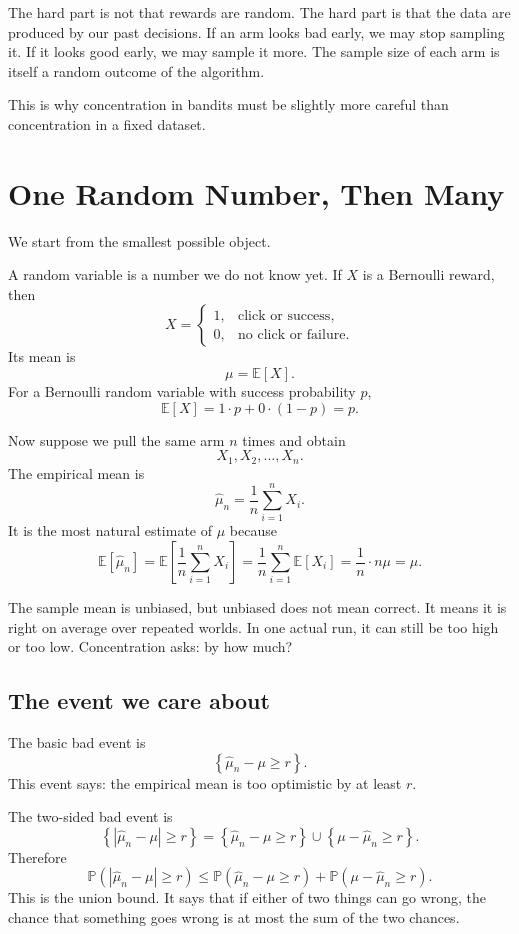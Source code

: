 \documentclass[en,nofont,11pt]{elegantbook}
\newcommand{\E}{\mathbb{E}}
\newcommand{\Pbb}{\mathbb{P}}
\begin{document}
The hard part is not that rewards are random. The hard part is that the data are produced by our past decisions. If an arm looks bad early, we may stop sampling it. If it looks good early, we may sample it more. The sample size of each arm is itself a random outcome of the algorithm.

This is why concentration in bandits must be slightly more careful than concentration in a fixed dataset.

\chapter{One Random Number, Then Many}

We start from the smallest possible object.

A random variable is a number we do not know yet. If $X$ is a Bernoulli reward, then
\[
X =
\begin{cases}
1, & \text{click or success},\\
0, & \text{no click or failure}.
\end{cases}
\]
Its mean is
\[
\mu = \E[X].
\]
For a Bernoulli random variable with success probability $p$,
\[
\E[X]
= 1\cdot p + 0\cdot (1-p)
= p.
\]

Now suppose we pull the same arm $n$ times and obtain
\[
X_1,X_2,\ldots,X_n.
\]
The empirical mean is
\[
\widehat\mu_n = \frac{1}{n}\sum_{i=1}^{n}X_i.
\]
It is the most natural estimate of $\mu$ because
\[
\E[\widehat\mu_n]
= \E\left[\frac{1}{n}\sum_{i=1}^{n}X_i\right]
= \frac{1}{n}\sum_{i=1}^{n}\E[X_i]
= \frac{1}{n}\cdot n\mu
= \mu.
\]

\begin{thinkbox}
The sample mean is unbiased, but unbiased does not mean correct. It means it is right on average over repeated worlds. In one actual run, it can still be too high or too low. Concentration asks: by how much?
\end{thinkbox}

\section{The event we care about}

The basic bad event is
\[
\left\{\widehat\mu_n - \mu \ge r\right\}.
\]
This event says: the empirical mean is too optimistic by at least $r$.

The two-sided bad event is
\[
\left\{|\widehat\mu_n - \mu| \ge r\right\}
= \left\{\widehat\mu_n - \mu \ge r\right\}
\cup
\left\{\mu - \widehat\mu_n \ge r\right\}.
\]
Therefore
\[
\Pbb\!\left(|\widehat\mu_n - \mu| \ge r\right)
\le
\Pbb\!\left(\widehat\mu_n - \mu \ge r\right)
+
\Pbb\!\left(\mu - \widehat\mu_n \ge r\right).
\]
This is the union bound. It says that if either of two things can go wrong, the chance that something goes wrong is at most the sum of the two chances.
\end{document}
